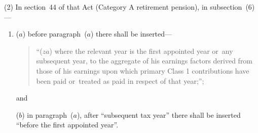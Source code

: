 \documentclass[12pt,a4paper]{article}
\begin{document}
(2) In section~44 of that Act (Category A retirement pension), in subsection~(6)—
\begin{enumerate}\item[]
($a$) before paragraph~($a$)  there shall be inserted—
\begin{quotation}
“($za$) where the relevant year is the first appointed year or~any subsequent year, to the aggregate of his earnings factors derived from those of his earnings upon which primary Class 1 contributions have been paid or~treated as paid in respect of that year;”;
\end{quotation}
and

($b$) in paragraph~($a$), after “subsequent tax year” there shall be inserted “before the first appointed year”.
\end{enumerate}
\end{document}
